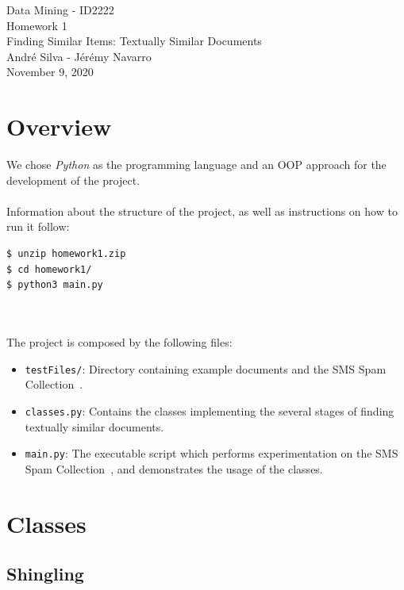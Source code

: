 \documentclass[]{article}
\begin{document}
\begin{center}
  {\large Data Mining - ID2222}\\
  \vspace{7mm}
  {\huge Homework 1\\[1ex]}
  {\Large Finding Similar Items: Textually Similar Documents}\\
  \vspace{7mm}  
  {André Silva - Jérémy Navarro\\}
  \vspace{4mm}
  {\large November 9, 2020\\}
\end{center}

\section{Overview}

We chose \textit{Python} as the programming language and an \textsc{OOP} approach for the development of the project.\\
\\
Information about the structure of the project, as well as instructions on how to run it follow:

\begin{lstlisting}[language=bash]
$ unzip homework1.zip
$ cd homework1/
$ python3 main.py
\end{lstlisting}
\\
\\
The project is composed by the following files:

\begin{itemize}
    \item \texttt{testFiles/}: Directory containing example documents and the SMS Spam Collection~\cite{sms}.
    \item \texttt{classes.py}: Contains the classes implementing the several stages of finding textually similar documents.
    \item \texttt{main.py}: The executable script which performs experimentation on the SMS Spam Collection~\cite{sms}, and demonstrates the usage of the classes.
\end{itemize}

\section{Classes}

\subsection{Shingling}
\end{document}
